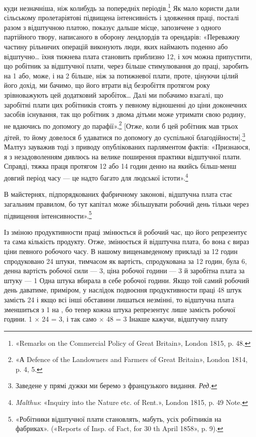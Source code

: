 \parcont{}  %
куди незначніша, ніж колибудь за попередніх періодів.\footnote{
«Remarks on the Commercial Policy of Great Britain», London
1815, p. 48.
} Як
мало користи дали сільському пролетаріятові підвищена інтенсивність
і здовження праці, посталі разом з відштучною платою,
показує дальше місце, запозичене з одного партійного твору,
написаного в оборону лендлордів та орендарів: «Переважну
частину рільничих операцій виконують люди, яких наймають
поденно або відштучно\dots{} їхня тижнева плата становить приблизно
12, і хоч можна припустити, що робітник за відштучної
плати, через більше стимулювання до праці, заробить на 1 або,
може, і на 2 більше, ніж за потижневої плати, проте,
цінуючи цілий його дохід, ми бачимо, що його втрати від безробіття
протягом року зрівноважують цей додатковий заробіток\dots{}
Далі ми побачимо взагалі, що заробітні плати цих робітників
стоять у певному відношенні до ціни доконечних засобів існування,
так що робітник з двома дітьми може утримати свою родину,
не вдаючись по допомогу до парафії».\footnote{
«А Defence of the Landowners and Farmers of Great Britain», London
1814, p. 4, 5.
} [Отже, коли б цей
робітник мав трьох дітей, то йому довелося б удаватися по допомогу
до суспільної благодійности].\footnote*{
Заведене у прямі дужки ми беремо з французького видання. \emph{Ред.}
} Малтуз зауважив тоді з
приводу опублікованих парляментом фактів: «Признаюся, я з
незадоволенням дивлюсь на велике поширення практики відштучної
плати. Справді, тяжка праця протягом 12 або 14 годин
денно на якийсь більш-менш довгий період часу — це надто багато
для людської істоти».\footnote{
\emph{Malthus}: «Inquiry into the Nature etc. of Rent.», London 1815,
p. 49 Note.
}

В майстернях, підпорядкованих фабричному законові, відштучна
плата стає загальним правилом, бо тут капітал може збільшувати
робочий день тільки через підвищення інтенсивности».\footnote{
«Робітники відштучної плати становлять, мабуть,  усіх робітників
на фабриках». («Reports of Insp. of Fact, for 30 th April
1858», p. 9).
}

Із зміною продуктивности праці змінюється й робочий час,
що його репрезентує та сама кількість продукту. Отже, змінюється
й відштучна плата, бо вона є вираз ціни певного робочого
часу. В нашому вищенаведеному прикладі за 12 годин спродуковано
24 штуки, тимчасом як вартість, спродукована за 12 годин,
була 6, денна вартість робочої сили — 3,
ціна робочої години — 3 й заробітна плата за штуку —
1 Одна штука вбирала в себе  робочої години. Якщо
той самий робочий день даватиме, приміром, у наслідок подвоєння
продуктивности праці 48 штук замість 24 і якщо всі інші
обставини лишаться незмінні, то відштучна плата зменшиться
з 1 на , бо тепер кожна штука репрезентує лише
 замість  робочої години. 1 × 24 = 3, і так
само  × 48 = 3 Інакше кажучи, відштучну плату
\parbreak{}  %
